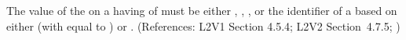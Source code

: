 The value of the   on a \Compartment having
 of  must be either ,
, , or the identifier of a
\UnitDefinition based on either  (with  equal
to ) or .  (References: L2V1 Section 4.5.4;
L2V2 Section~4.7.5; )
